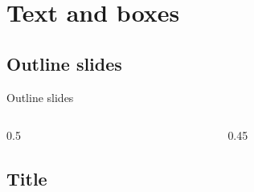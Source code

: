 
\section{Text and boxes}

\subsection{Outline slides}
\begin{frame}{Outline slides}
\begin{columns}[T,onlytextwidth]
\begin{column}{0.5\textwidth}
\begin{codeonly}
\end{codeonly}
\smallskip
{}
\begin{codeonly}
\subsection{Title}
\end{codeonly}
\smallskip
{}
\begin{codeonly}
\tocnumbers
\end{codeonly}
\end{column}
\begin{column}{0.45\textwidth}
\tableofcontents[currentsection,sections={1-3},subsectionstyle=show/show/hide]
\end{column}
\end{columns}
\end{frame}

